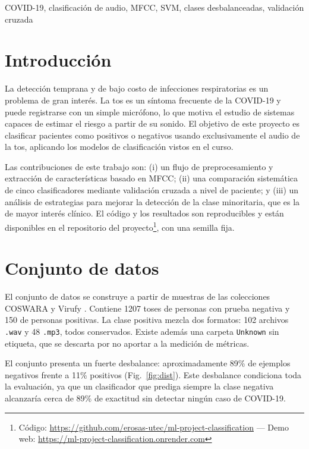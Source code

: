 \documentclass[conference]{IEEEtran}
\begin{document}
\begin{IEEEkeywords}
COVID-19, clasificaci\'on de audio, MFCC, SVM, clases desbalanceadas, validaci\'on cruzada
\end{IEEEkeywords}

\section{Introducci\'on}
La detecci\'on temprana y de bajo costo de infecciones respiratorias es un problema de gran inter\'es. La tos es un s\'intoma frecuente de la COVID-19 y puede registrarse con un simple micr\'ofono, lo que motiva el estudio de sistemas capaces de estimar el riesgo a partir de su sonido. El objetivo de este proyecto es clasificar pacientes como positivos o negativos usando exclusivamente el audio de la tos, aplicando los modelos de clasificaci\'on vistos en el curso.

Las contribuciones de este trabajo son: (i) un flujo de preprocesamiento y extracci\'on de caracter\'isticas basado en MFCC; (ii) una comparaci\'on sistem\'atica de cinco clasificadores mediante validaci\'on cruzada a nivel de paciente; y (iii) un an\'alisis de estrategias para mejorar la detecci\'on de la clase minoritaria, que es la de mayor inter\'es cl\'inico. El c\'odigo y los resultados son reproducibles y est\'an disponibles en el repositorio del proyecto\footnote{C\'odigo: \url{https://github.com/erosas-utec/ml-project-classification} --- Demo web: \url{https://ml-project-classification.onrender.com}}, con una semilla fija.

\section{Conjunto de datos}
El conjunto de datos se construye a partir de muestras de las colecciones COSWARA \cite{coswara} y Virufy \cite{virufy}. Contiene 1207 toses de personas con prueba negativa y 150 de personas positivas. La clase positiva mezcla dos formatos: 102 archivos \texttt{.wav} y 48 \texttt{.mp3}, todos conservados. Existe adem\'as una carpeta \texttt{Unknown} sin etiqueta, que se descarta por no aportar a la medici\'on de m\'etricas.

El conjunto presenta un fuerte desbalance: aproximadamente 89\% de ejemplos negativos frente a 11\% positivos (Fig.~\ref{fig:dist}). Este desbalance condiciona toda la evaluaci\'on, ya que un clasificador que prediga siempre la clase negativa alcanzar\'ia cerca de 89\% de exactitud sin detectar ning\'un caso de COVID-19.
\end{document}
